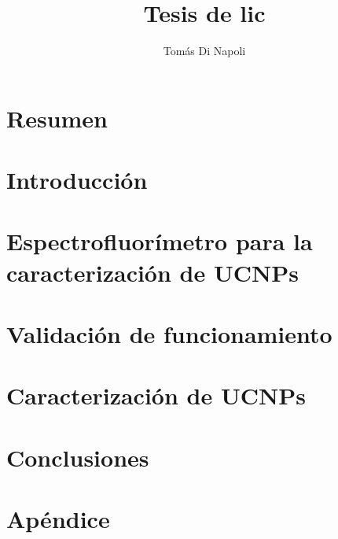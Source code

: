 \documentclass[12pt]{report}
\title{Tesis de lic}
\author{Tomás Di Napoli}
\begin{document}
\maketitle

\chapter*{Resumen}

\tableofcontents

\chapter{Introducción}


\chapter{Espectrofluorímetro para la caracterización de UCNPs}


\chapter{Validación de funcionamiento}


\chapter{Caracterización de UCNPs}


\chapter{Conclusiones}


\appendix
\chapter{Apéndice}

\end{document}
